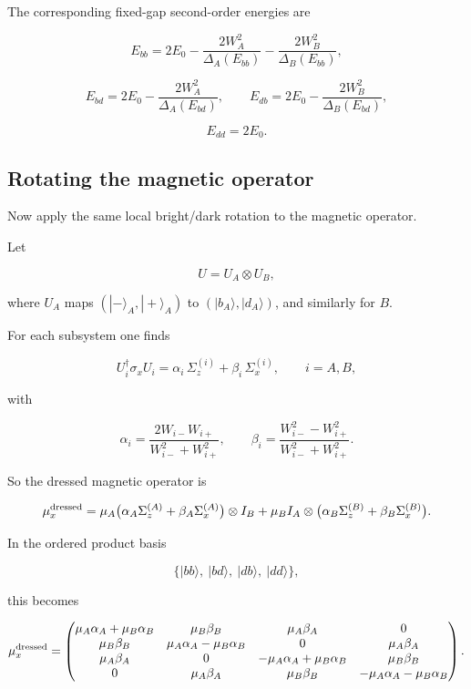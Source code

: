 \documentclass[
]{article}
\renewcommand{\[}{\begin{equation}}
\renewcommand{\]}{\end{equation}}
\begin{document}
The corresponding fixed-gap second-order energies are

\[
E_{bb}= 2E_0-\frac{2W_A^2}{\Delta_A(E_{bb})}-\frac{2W_B^2}{\Delta_B(E_{bb})},
\label{eq:EbbSym}
\]

\[
E_{bd}= 2E_0-\frac{2W_A^2}{\Delta_A(E_{bd})},
\qquad
E_{db}= 2E_0-\frac{2W_B^2}{\Delta_B(E_{bd})},
\label{eq:EbdEdbSym}
\]

\[
E_{dd}=2E_0.
\label{eq:EddSym}
\]

\subsection{Rotating the magnetic
operator}\label{rotating-the-magnetic-operator}

Now apply the same local bright/dark rotation to the magnetic operator.

Let

\[
U=U_A\otimes U_B,
\label{eq:UAB}
\]

where \(U_A\) maps \((|-\rangle_A,|+\rangle_A)\) to
\((|b_A\rangle,|d_A\rangle)\), and similarly for \(B\).

For each subsystem one finds

\[
U_i^\dagger \sigma_x U_i =
\alpha_i\,\Sigma_z^{(i)}+\beta_i\,\Sigma_x^{(i)},
\qquad i=A,B,
\label{eq:localRotSigmaX}
\]

with

\[
\alpha_i=\frac{2W_{i-}W_{i+}}{W_{i-}^2+W_{i+}^2},
\qquad
\beta_i=\frac{W_{i-}^2-W_{i+}^2}{W_{i-}^2+W_{i+}^2}.
\label{eq:alphabeta}
\]

So the dressed magnetic operator is

\[
\mu_x^{\rm dressed} =
\mu_A\big(\alpha_A\Sigma_z^{(A)}+\beta_A\Sigma_x^{(A)}\big)\otimes I_B
+
\mu_B I_A\otimes\big(\alpha_B\Sigma_z^{(B)}+\beta_B\Sigma_x^{(B)}\big).
\label{eq:muXdressedCompact}
\]

In the ordered product basis

\[
\{|bb\rangle,\ |bd\rangle,\ |db\rangle,\ |dd\rangle\},
\label{eq:ABdressedBasisOrder}
\]

this becomes

\[
\mu_x^{\rm dressed} =
\begin{pmatrix}
\mu_A\alpha_A+\mu_B\alpha_B & \mu_B\beta_B & \mu_A\beta_A & 0 \\
\mu_B\beta_B & \mu_A\alpha_A-\mu_B\alpha_B & 0 & \mu_A\beta_A \\
\mu_A\beta_A & 0 & -\mu_A\alpha_A+\mu_B\alpha_B & \mu_B\beta_B \\
0 & \mu_A\beta_A & \mu_B\beta_B & -\mu_A\alpha_A-\mu_B\alpha_B
\end{pmatrix}.
\label{eq:muXdressedMatrix}
\]
\end{document}

